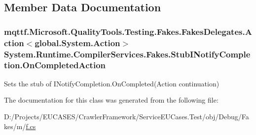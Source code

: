 \subsection{Member Data Documentation}
\hypertarget{class_system_1_1_runtime_1_1_compiler_services_1_1_fakes_1_1_stub_i_notify_completion_a8a236cc5fb172b9a39f3e586f244db74}{
\subsubsection[{On\-Completed\-Action}]{\setlength{\rightskip}{0pt plus 5cm}mqttf.\-Microsoft.\-Quality\-Tools.\-Testing.\-Fakes.\-Fakes\-Delegates.\-Action$<$global.\-System.\-Action$>$ System.\-Runtime.\-Compiler\-Services.\-Fakes.\-Stub\-I\-Notify\-Completion.\-On\-Completed\-Action}}\label{class_system_1_1_runtime_1_1_compiler_services_1_1_fakes_1_1_stub_i_notify_completion_a8a236cc5fb172b9a39f3e586f244db74}


Sets the stub of I\-Notify\-Completion.\-On\-Completed(\-Action continuation)



The documentation for this class was generated from the following file\-:\begin{DoxyCompactItemize}
\item 
D\-:/\-Projects/\-E\-U\-C\-A\-S\-E\-S/\-Crawler\-Framework/\-Service\-E\-U\-Cases.\-Test/obj/\-Debug/\-Fakes/m/\hyperlink{m_2f_8cs}{f.\-cs}\end{DoxyCompactItemize}
